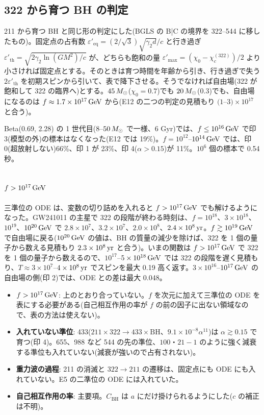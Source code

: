 \subsection{322 から育つ BH の判定}

211 から育つ BH と同じ形の判定にした(BGLS の B|C の境界を 322--544 に移したもの)。固定点の占有数 $\varepsilon'_\mathrm{eq}=(2/\sqrt3)\sqrt{\gamma_2d}/c$ と行き過ぎ $\varepsilon'_\mathrm{th}=\sqrt{2\gamma_2\ln(GM^2)/c}$ が、どちらも飽和の量 $\varepsilon'_\mathrm{max}=(\chi_0-\chi_c^{(322)})/2$ より小さければ固定点とする。そのときは育つ時間を年齢から引き、行き過ぎで失う $2\varepsilon'_\mathrm{th}$ を初期スピンから引いて、表で降下させる。そうでなければ自由場(322 が飽和して 322 の臨界へ)とする。$45\,M_\odot$($\chi_0=0.7$)でも $20\,M_\odot$(0.3)でも、自由場になるのは $f\approx1.7\times10^{17}\,\mathrm{GeV}$ から(E12 の二つの判定の見積もり $(1$--$3)\times10^{17}$ と合う)。

\begin{result}
Beta(0.69, 2.28) の 1 世代目($8$--$50\,M_\odot$ で一様、6 Gyr)では、$f\le10^{16}\,\mathrm{GeV}$ で印 3(模型の外)の標本はなくなった(E12 では 19\%)。$f=10^{12}$--$10^{14}\,\mathrm{GeV}$ では、印 0(超放射しない)66\%、印 1 が 23\%、印 4($\alpha>0.15$)が 11\%。$10^6$ 個の標本で 0.54 秒。
\end{result}

\subsection{$f>10^{17}\,\mathrm{GeV}$}

三準位の ODE は、変数の切り詰めを入れると $f>10^{17}\,\mathrm{GeV}$ でも解けるようになった。GW241011 の主星で 322 の段階が終わる時刻は、$f=10^{18}$、$3\times10^{18}$、$10^{19}$、$10^{20}\,\mathrm{GeV}$ で $2.8\times10^7$、$3.2\times10^7$、$2.0\times10^8$、$2.4\times10^8\,\mathrm{yr}$。$f\gtrsim10^{19}\,\mathrm{GeV}$ で自由場に戻る($10^{20}\,\mathrm{GeV}$ の値は、BH の質量の減少を除けば、322 を 1 個の量子から数える見積もり $2.3\times10^8\,\mathrm{yr}$ と合う)。いまの関数は $f>10^{17}\,\mathrm{GeV}$ で 322 を 1 個の量子から数えるので、$10^{17}$--$5\times10^{18}\,\mathrm{GeV}$ では 322 の段階を遅く見積もり、$T\approx3\times10^7$--$4\times10^8\,\mathrm{yr}$ でスピンを最大 0.19 高く返す。$3\times10^{16}$--$10^{17}\,\mathrm{GeV}$ の自由場の側(印 2)では、ODE との差は最大 0.048。

\begin{caveat}
\begin{itemize}
\item \textbf{$f>10^{17}\,\mathrm{GeV}$}: 上のとおり合っていない。$f$ を次元に加えて三準位の ODE を表にする必要がある(自己相互作用の率が $f$ の前の因子に出ない領域なので、表の方法は使えない)。
\item \textbf{入れていない準位}: 433($211\times322\to433\times\mathrm{BH}$、$9.1\times10^{-8}\alpha^{11}$)は $\alpha\gtrsim0.15$ で育つ(印 4)。655、988 など 544 の先の準位、$100$・$21{-}1$ のように強く減衰する準位も入れていない(減衰が強いので占有されない)。
\item \textbf{重力波の過程}: 211 の消滅と $322\to211$ の遷移は、固定点にも ODE にも入れていない。E5 の二準位の ODE には入れていた。
\item \textbf{自己相互作用の率}: 主要項。$C_\mathrm{BH}$ は $a$ にだけ掛けられるようにした($c$ の補正は不明)。
\end{itemize}
\end{caveat}
